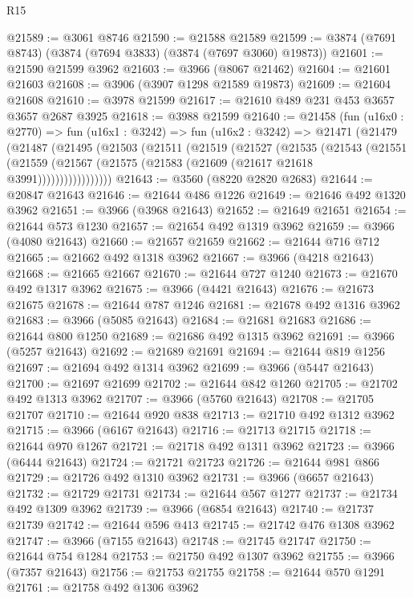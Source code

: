 \begin{lexlean}{R15}
\begin{coremodule}
@21589 := @3061 @8746
@21590 := @21588 @21589
@21599 := @3874 (@7691 @8743) (@3874 (@7694 @3833) (@3874 (@7697 @3060) @19873))
@21601 := @21590 @21599 @3962
@21603 := @3966 (@8067 @21462)
@21604 := @21601 @21603
@21608 := @3906 (@3907 @1298 @21589 @19873)
@21609 := @21604 @21608
@21610 := @3978 @21599
@21617 := @21610 @489 @231 @453 @3657 @3657 @2687 @3925
@21618 := @3988 @21599
@21640 := @21458
    (fun (u16x0 : @2770) =>
    fun (u16x1 : @3242) =>
    fun (u16x2 : @3242) =>
    @21471
      (@21479
        (@21487
          (@21495
            (@21503
              (@21511
                (@21519
                  (@21527
                    (@21535
                      (@21543
                        (@21551
                          (@21559
                            (@21567 (@21575 (@21583 (@21609 (@21617 @21618 @3991)))))))))))))))))
@21643 := @3560 (@8220 @2820 @2683)
@21644 := @20847 @21643
@21646 := @21644 @486 @1226
@21649 := @21646 @492 @1320 @3962
@21651 := @3966 (@3968 @21643)
@21652 := @21649 @21651
@21654 := @21644 @573 @1230
@21657 := @21654 @492 @1319 @3962
@21659 := @3966 (@4080 @21643)
@21660 := @21657 @21659
@21662 := @21644 @716 @712
@21665 := @21662 @492 @1318 @3962
@21667 := @3966 (@4218 @21643)
@21668 := @21665 @21667
@21670 := @21644 @727 @1240
@21673 := @21670 @492 @1317 @3962
@21675 := @3966 (@4421 @21643)
@21676 := @21673 @21675
@21678 := @21644 @787 @1246
@21681 := @21678 @492 @1316 @3962
@21683 := @3966 (@5085 @21643)
@21684 := @21681 @21683
@21686 := @21644 @800 @1250
@21689 := @21686 @492 @1315 @3962
@21691 := @3966 (@5257 @21643)
@21692 := @21689 @21691
@21694 := @21644 @819 @1256
@21697 := @21694 @492 @1314 @3962
@21699 := @3966 (@5447 @21643)
@21700 := @21697 @21699
@21702 := @21644 @842 @1260
@21705 := @21702 @492 @1313 @3962
@21707 := @3966 (@5760 @21643)
@21708 := @21705 @21707
@21710 := @21644 @920 @838
@21713 := @21710 @492 @1312 @3962
@21715 := @3966 (@6167 @21643)
@21716 := @21713 @21715
@21718 := @21644 @970 @1267
@21721 := @21718 @492 @1311 @3962
@21723 := @3966 (@6444 @21643)
@21724 := @21721 @21723
@21726 := @21644 @981 @866
@21729 := @21726 @492 @1310 @3962
@21731 := @3966 (@6657 @21643)
@21732 := @21729 @21731
@21734 := @21644 @567 @1277
@21737 := @21734 @492 @1309 @3962
@21739 := @3966 (@6854 @21643)
@21740 := @21737 @21739
@21742 := @21644 @596 @413
@21745 := @21742 @476 @1308 @3962
@21747 := @3966 (@7155 @21643)
@21748 := @21745 @21747
@21750 := @21644 @754 @1284
@21753 := @21750 @492 @1307 @3962
@21755 := @3966 (@7357 @21643)
@21756 := @21753 @21755
@21758 := @21644 @570 @1291
@21761 := @21758 @492 @1306 @3962

\end{coremodule}
\end{lexlean}
